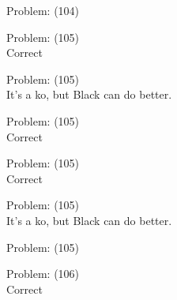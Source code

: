\documentclass[11pt]{article}
\begin{document}
\begin{minipage}[t]{0.5\textwidth}
  {\centering
  
Problem: (104)\\
  }
\end{minipage}
\begin{minipage}[t]{0.5\textwidth}
  {\centering
  
Problem: (105)\\
Correct\\
  }
\end{minipage}
\begin{minipage}[t]{0.5\textwidth}
  {\centering
  
Problem: (105)\\
It's a ko, but Black can do better.\\
  }
\end{minipage}
\begin{minipage}[t]{0.5\textwidth}
  {\centering
  
Problem: (105)\\
Correct\\
  }
\end{minipage}
\begin{minipage}[t]{0.5\textwidth}
  {\centering
  
Problem: (105)\\
Correct\\
  }
\end{minipage}
\begin{minipage}[t]{0.5\textwidth}
  {\centering
  
Problem: (105)\\
It's a ko, but Black can do better.\\
  }
\end{minipage}
\begin{minipage}[t]{0.5\textwidth}
  {\centering
  
Problem: (105)\\
  }
\end{minipage}
\begin{minipage}[t]{0.5\textwidth}
  {\centering
  
Problem: (106)\\
Correct\\
  }
\end{minipage}
\end{document}
